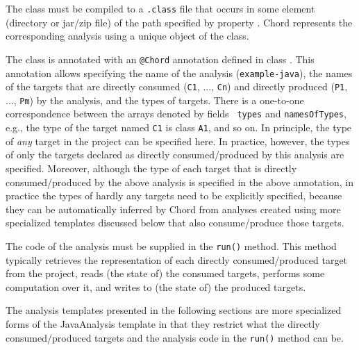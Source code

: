 The class must be compiled to a {\tt .class} file that occurs in
some element (directory or jar/zip file) of the path
specified by property .  Chord represents the
corresponding analysis using a unique object of the class.

The class is annotated with an {\tt @Chord} annotation defined in
class .  This annotation
allows specifying the name of the analysis ({\tt example-java}), the names of
the targets that are directly consumed ({\tt C1}, ..., {\tt Cn}) and directly
produced ({\tt P1}, ..., {\tt Pm}) by the analysis, and the types of targets.
There is a one-to-one correspondence between the arrays denoted by fields {\tt
types} and {\tt namesOfTypes}, e.g., the type of the target named {\tt C1} is
class {\tt A1}, and so on.  In principle, the type of {\it any} target in the
project can be specified here.  In practice, however, the types of only the
targets declared as directly consumed/produced by this analysis are specified.
Moreover, although the type of each target that is directly consumed/produced by
the above analysis is specified in the above annotation, in practice the types
of hardly any targets need to be explicitly specified, because they can be
automatically inferred by Chord from analyses created using more specialized
templates discussed below that also consume/produce those targets.

The code of the analysis must be supplied in the {\tt run()} method.  This
method typically retrieves the representation of each directly consumed/produced
target from the project, reads (the state of) the consumed targets, performs
some computation over it, and writes to (the state of) the produced targets.

The analysis templates presented in the following sections are more specialized
forms of the JavaAnalysis template in that they restrict what the directly
consumed/produced targets and the analysis code in the {\tt run()} method can
be.


